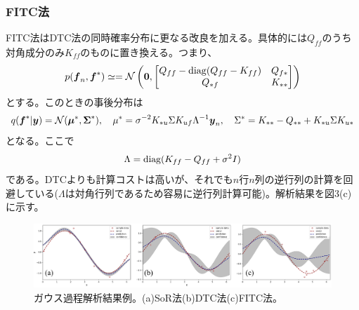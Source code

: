 \documentclass[dvipdfmx, 9pt, a4paper]{jsarticle}
\numberwithin{equation}{section}
\newcommand{\bm}[1]{{\mbox{\boldmath $#1$}}}
\begin{document}
\subsubsection{FITC法}
FITC法はDTC法の同時確率分布に更なる改良を加える。具体的には$Q_{ff}$のうち対角成分のみ$K_{ff}$のものに置き換える。つまり、
\begin{equation}
p(\bm f_n, \bm f^*) \simeq =\mathcal{N}
\left(\bm 0,
\begin{bmatrix}
Q_{ff}-{\rm diag}(Q_{ff}-K_{ff}) & Q_{f*} \\
Q_{*f} & K_{**}
\end{bmatrix}
\right) \notag
\end{equation}
とする。このときの事後分布は
\begin{equation}
q(\bm f^*|\bm y)=\mathcal{N}(\bm \mu^*, \bm \Sigma^*),~~~\mu^*=\sigma^{-2}K_{*u}\Sigma K_{uf}\Lambda^{-1}\bm y_n,~~~\Sigma^*=K_{**}-Q_{**}+K_{*u}\Sigma K_{u*}
\end{equation}
となる。ここで
\begin{equation}
\Lambda={\rm diag}(K_{ff}-Q_{ff}+\sigma^2I)
\end{equation}
である。DTCよりも計算コストは高いが、それでも$n$行$n$列の逆行列の計算を回避している($\Lambda$は対角行列であるため容易に逆行列計算可能)。解析結果を図3(c)に示す。

\begin{figure}[b]
\begin{center}
\includegraphics[width=18cm]{fig3.png}
\caption{ガウス過程解析結果例。(a)SoR法(b)DTC法(c)FITC法。}
\end{center}
\end{figure}
\end{document}
